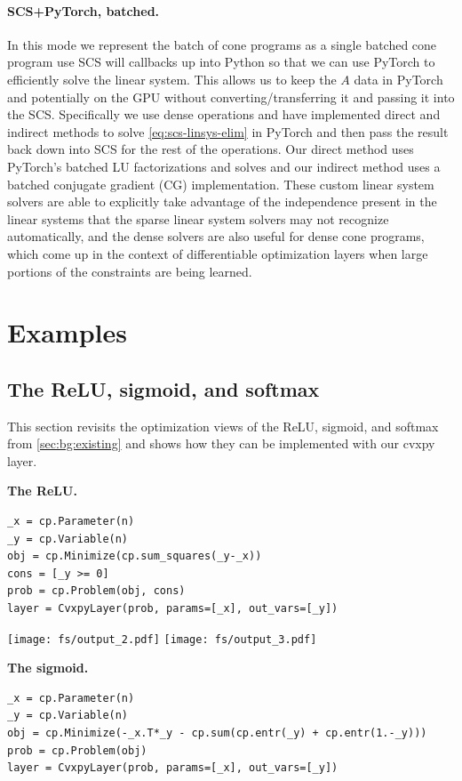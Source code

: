 \paragraph{SCS+PyTorch, batched.}
In this mode we represent the batch of cone programs as a single
batched cone program use SCS will callbacks up into Python so
that we can use PyTorch to efficiently solve the linear system.
This allows us to keep the $A$ data in PyTorch and potentially
on the GPU without converting/transferring it and passing it
into the SCS.
Specifically we use dense operations and have implemented
direct and indirect methods to solve \cref{eq:scs-linsys-elim}
in PyTorch and then pass the result back down into SCS for the
rest of the operations.
Our direct method uses PyTorch's batched LU factorizations and
solves and our indirect method uses a batched conjugate
gradient (CG) implementation.
These custom linear system solvers are able to explicitly take
advantage of the independence present in the linear systems
that the sparse linear system solvers may not recognize automatically,
and the dense solvers are also useful for dense cone programs,
which come up in the context of differentiable optimization
layers when large portions of the constraints are being learned.

\section{Examples}
\subsection{The ReLU, sigmoid, and softmax}
This section revisits the optimization views of the ReLU,
sigmoid, and softmax from \cref{sec:bg:existing} and shows how
they can be implemented with our cvxpy layer.

\textbf{The ReLU.}
\begin{lstlisting}
_x = cp.Parameter(n)
_y = cp.Variable(n)
obj = cp.Minimize(cp.sum_squares(_y-_x))
cons = [_y >= 0]
prob = cp.Problem(obj, cons)
layer = CvxpyLayer(prob, params=[_x], out_vars=[_y])
\end{lstlisting}

\texttt{[image: fs/output\_2.pdf]}
\texttt{[image: fs/output\_3.pdf]}

\textbf{The sigmoid.}
\begin{lstlisting}
_x = cp.Parameter(n)
_y = cp.Variable(n)
obj = cp.Minimize(-_x.T*_y - cp.sum(cp.entr(_y) + cp.entr(1.-_y)))
prob = cp.Problem(obj)
layer = CvxpyLayer(prob, params=[_x], out_vars=[_y])
\end{lstlisting}

